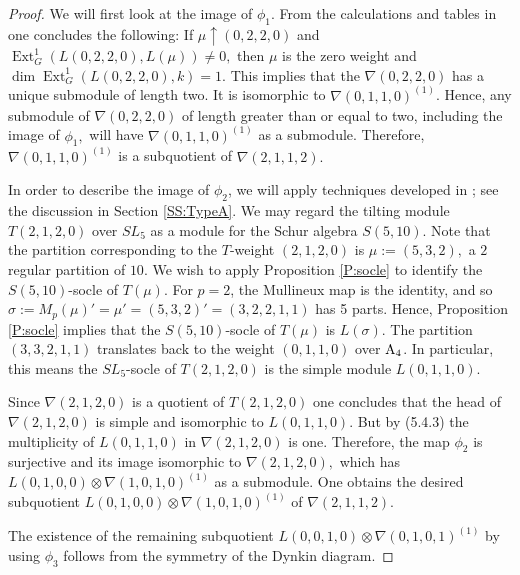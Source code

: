 \documentclass[twoside,11pt,reqno]{amsart}
\newcommand{\Ext}{\operatorname{Ext}}
\newcommand{\0}{\bar 0}
\newcommand{\1}{\bar 1}
\newcommand{\si}{\sigma}
\theoremstyle{definition}
\numberwithin{equation}{subsection}
\begin{document}
\begin{proof}
We will first look at the image of $\phi_1.$ From the calculations and tables in \cite[III.2.3, III.2.4]{DS} one concludes the following:
If $\mu \uparrow (0,2,2,0)$ and $\Ext^1_G(L(0,2,2,0), L(\mu))\neq 0,$ then $\mu$ is the zero weight and $\dim \Ext^1_G(L(0,2,2,0), k)=1.$ 
This implies that the  $\nabla(0,2,2,0)$ has a unique submodule of length two. It is isomorphic to $\nabla(0,1,1,0)^{(1)}$. Hence, any submodule of $\nabla(0,2,2,0)$ of length greater than or equal to two, including the image of $\phi_1,$ will have $\nabla(0,1,1,0)^{(1)}$ as a submodule. Therefore,  $\nabla(0,1,1,0)^{(1)}$ is a subquotient of $\nabla(2,1,1,2).$

In order to describe the image of $\phi_2$, we will apply techniques developed in \cite{BNPS26}; see the discussion in Section \ref{SS:TypeA}. We may regard the tilting module $T(2,1,2,0)$ over $SL_5$ as a module for the Schur algebra $S(5,10)$. Note that the partition corresponding to the $T$-weight $(2,1,2,0)$ is $\mu := (5,3,2),$ a $2$ regular partition of $10$.  We wish to apply Proposition \ref{P:socle} to identify the $S(5,10)$-socle of $T(\mu)$.   For $p =2$, the Mullineux map is the identity, and so $\si := M_p(\mu)' = \mu' = (5,3,2)' = (3,2,2,1,1)$ has 5 parts.  Hence, Proposition \ref{P:socle} implies that the $S(5,10)$-socle of $T(\mu)$ is $L(\si)$.  The partition $(3,3,2,1,1)$ translates back to the weight $(0,1,1,0)$ over $\rm{A}_4$. In particular, this means the $SL_5$-socle of $T(2,1,2,0)$ is the simple module $L(0,1,1,0)$. 

Since $\nabla(2,1,2,0)$ is a quotient of $T(2,1,2,0)$ one concludes that the head of $\nabla(2,1,2,0)$ is simple and isomorphic to $L(0,1,1,0)$. But by (5.4.3) the multiplicity of $L(0,1,1,0)$ in $\nabla(2,1,2,0)$ is one. Therefore, the map $\phi_2$ is surjective and its image isomorphic to $\nabla(2,1,2,0),$ which has $L(0,1,0,0) \otimes \nabla(1,0,1,0)^{(1)}$ as a submodule. 
One obtains the desired subquotient $L(0,1,0,0) \otimes \nabla(1,0,1,0)^{(1)}$ of $\nabla(2,1,1,2).$

The existence of the remaining subquotient $L(0,0,1,0) \otimes \nabla(0,1,0,1)^{(1)}$ by using $\phi_{3}$ follows from the symmetry of the Dynkin diagram.
\end{proof}
﻿
﻿
\end{document}
